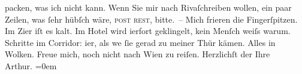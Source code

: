 \begin{ledgroupsized}[t]{13cm}
               packen, was ich nicht kann.\pend
           \pstart
           Wenn Sie mir nach Rivaſchreiben wollen, ein paar Zeilen, was ſehr hübſch
               wäre, \textsc{post rest}, bitte. –\pend
           \pstart
           Mich frieren die Fingerſpitzen. Im Zi{\geminationm}er iſt es kalt. Im
               Hotel wird i{\geminationm}erfort geklingelt, kein Menſch weiſs warum.
               Schritte im Corridor: i{\geminationm}er, als we{\geminationn}{ }ſie gerad zu meiner Thür kämen. Alles in Wolken.
                  {\pb}Freue mich, noch nicht nach Wien zu reiſen.\pend
           \pstart
           Herzlichſt der Ihre{\\[\baselineskip]}\spacefill\mbox{Arthur.}\pend
           \leftskip=0em{}
         
         \endnumbering{}\end{ledgroupsized}  \newcommand{\dateiname}{L00122}\newcommand{\titel}{Arthur Schnitzler an Hugo von Hofmannsthal, 11. 9. 1892}\newcommand{\editorInnen}{Martin Anton Müller und Gerd-Hermann Susen}
      